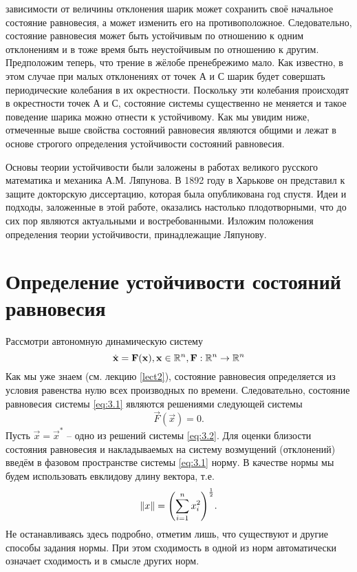 зависимости от величины отклонения шарик может сохранить своё начальное
состояние равновесия, а может изменить его на противоположное.
Следовательно, состояние равновесия может быть устойчивым по отношению к
одним отклонениям и в тоже время быть неустойчивым по отношению к
другим. Предположим теперь, что трение в жёлобе пренебрежимо мало. Как
известно, в этом случае при малых отклонениях от точек А и С шарик будет
совершать периодические колебания в их окрестности. Поскольку эти
колебания происходят в окрестности точек А и С, состояние системы
существенно не меняется и такое поведение шарика можно отнести к
устойчивому. Как мы увидим ниже, отмеченные выше свойства состояний
равновесия являются общими и лежат в основе строгого определения
устойчивости состояний равновесия.

Основы теории устойчивости были заложены в работах великого
русского математика и механика А.М. Ляпунова. В 1892 году в Харькове он
представил к защите докторскую диссертацию, которая была опубликована год
спустя. Идеи и подходы, заложенные в этой работе, оказались настолько
плодотворными, что до сих пор являются актуальными и востребованными.
Изложим положения определения теории устойчивости, принадлежащие
Ляпунову.

\section{Определение устойчивости состояний равновесия}%


Рассмотри автономную динамическую систему
\begin{equation}
    \label{eq:3.1}
    \dot {\mathbf{x}} =  \mathbf{F}(\mathbf{x}), \mathbf{x} \in \mathbb{R}^n,   \mathbf{F}: \mathbb{R}^n \rightarrow \mathbb{R}^n
\end{equation}
Как мы уже знаем (см. лекцию \ref{lect2}), состояние равновесия определяется из условия равенства нулю всех производных по времени. Следовательно, состояние равновесия системы \eqref{eq:3.1} являются решениями следующей системы
\begin{equation}
    \label{eq:3.2}
    \vec F(\vec x) = 0 . 
\end{equation}
Пусть $\vec x= \vec x^*$ -- одно из решений системы \eqref{eq:3.2}. Для оценки близости состояния равновесия и накладываемых на систему возмущений (отклонений) введём в фазовом пространстве системы    \eqref{eq:3.1} норму. В качестве нормы мы будем использовать евклидову длину вектора, т.е.
\begin{equation}
    \label{eq:}
    \norm {x}=\qty( \sum\limits_{i=1}^n x_i^2) ^{\frac12}.
\end{equation}
Не останавливаясь здесь подробно, отметим лишь, что существуют и другие способы задания нормы. При этом сходимость в одной из норм автоматически означает сходимость и в смысле других норм.

